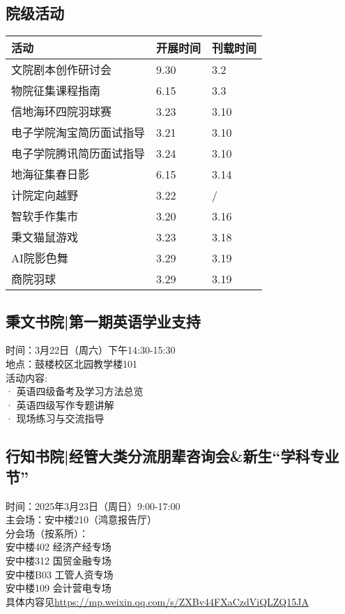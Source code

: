 \documentclass[letterpaper, 12pt]{article}
\begin{document}
\begin{multicols}{2}
\section{院级活动}
\begin{tabular}{|>{\centering\arraybackslash}m{}|m{}|m{}|}
\hline
    活动 & 开展时间 & 刊载时间\\
    \hline\hline
    文院剧本创作研讨会 & 9.30 & 3.2\\
    物院征集课程指南 & 6.15 & 3.3\\
    信地海环四院羽球赛 & 3.23 & 3.10\\
    电子学院淘宝简历面试指导 & 3.21 & 3.10\\
    电子学院腾讯简历面试指导 & 3.24 & 3.10\\
    地海征集春日影 & 6.15 & 3.14\\
    计院定向越野 & 3.22 & / \\
    智软手作集市 & 3.20 & 3.16\\
    秉文猫鼠游戏 & 3.23 & 3.18\\
    AI院影色舞 & 3.29 & 3.19\\
    商院羽球 & 3.29 & 3.19\\
    \hline
\end{tabular}
\subsection{秉文书院|第一期英语学业支持}
时间：3月22日（周六）下午14:30-15:30\\
地点：鼓楼校区北园教学楼101\\
活动内容:\\
· 英语四级备考及学习方法总览\\
· 英语四级写作专题讲解\\
· 现场练习与交流指导\\
\subsection{行知书院|经管大类分流朋辈咨询会\&新生“学科专业节”}
时间：2025年3月23日（周日）9:00-17:00\\
主会场：安中楼210（鸿意报告厅）\\
分会场（按系所）：\\
安中楼402 经济产经专场\\
安中楼312 国贸金融专场\\
安中楼B03 工管人资专场\\
安中楼109 会计营电专场\\
具体内容见\url{https://mp.weixin.qq.com/s/ZXBv44FXaCzdViQLZQ15JA}

\end{multicols}
\end{document}
